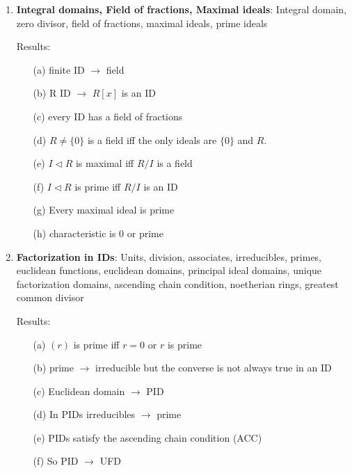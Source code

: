 \documentclass{article}
\begin{document}
\begin{enumerate}
	\item \textbf{Integral domains, Field of fractions, Maximal ideals}: Integral domain, zero divisor, field of fractions, maximal ideals, prime ideals

	Results:
	\begin{enumerate}
		\item [(a)] finite ID $\rightarrow$ field

		\item [(b)] R ID $\rightarrow$ $R[x]$ is an ID

		\item [(c)] every ID has a field of fractions

		\item [(d)] $R \neq \{0\}$ is a field iff the only ideals are $\{0\}$ and $R$.

		\item [(e)] $I \triangleleft R$ is maximal iff $R/I$ is a field

		\item [(f)] $I \triangleleft R$ is prime iff $R/I$ is an ID	

		\item [(g)] Every maximal ideal is prime 

		\item [(h)] characteristic is $0$ or prime
	\end{enumerate}

	\item \textbf{Factorization in IDs}: Units, division, associates, irreducibles, primes, euclidean functions, euclidean domains, principal ideal domains, unique factorization domains, ascending chain condition, noetherian rings, greatest common divisor 

	Results:
	\begin{enumerate}
		\item [(a)] $(r)$ is prime iff $r = 0$ or $r$ is prime	

		\item [(b)] prime $\rightarrow$ irreducible but the converse is not always true in an ID 

		\item [(c)] Euclidean domain $\rightarrow$ PID 

		\item [(d)] In PIDs irreducibles $\rightarrow$ prime 

		\item [(e)] PIDs satisfy the ascending chain condition (ACC) 

		\item [(f)] So PID $\rightarrow$ UFD 


\end{enumerate}
\end{enumerate}
\end{document}
